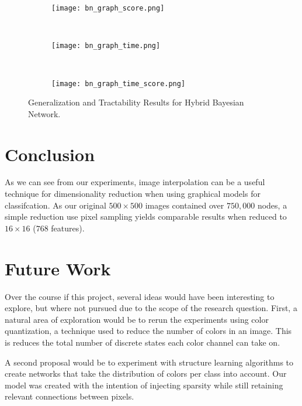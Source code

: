 \documentclass{article}
\begin{document}
\begin{figure}
  \centering
  \begin{subfigure}[b]{0.3\textwidth}
    \centering
    \texttt{[image: bn\_graph\_score.png]}
    \caption*{}
    \label{fig:lr_graph_score}
  \end{subfigure}
  ~
  \begin{subfigure}[b]{0.3\textwidth}
    \centering
    \texttt{[image: bn\_graph\_time.png]}
    \caption*{}
    \label{fig:lr_graph_time}
  \end{subfigure}
  ~
  \begin{subfigure}[b]{0.3\textwidth}
    \centering
    \texttt{[image: bn\_graph\_time\_score.png]}
    \caption*{}
    \label{fig:lr_graph_time_score}
  \end{subfigure}
  \vspace{-10pt}
  \caption{Generalization and Tractability Results for Hybrid Bayesian Network.}
\end{figure}


\section{Conclusion}
\label{sec:conclusion}
As we can see from our experiments, image interpolation can be a useful technique
for dimensionality reduction when using graphical models for classifcation.
As our original $500 \times 500$ images contained over $750,000$ nodes, a simple
reduction use pixel sampling yields comparable results when reduced to
$16 \times 16$ ($768$ features).


\section{Future Work}
Over the course if this project, several ideas would have been interesting to
explore, but where not pursued due to the scope of the research question. First,
a natural area of exploration would be to rerun the experiments using color
quantization, a technique used to reduce the number of colors in an image. This
is reduces the total number of discrete states each color channel can take on.

A second proposal would be to experiment with structure learning algorithms to
create networks that take the distribution of colors per class into account.
Our model was created with the intention of injecting sparsity while still
retaining relevant connections between pixels.
\end{document}
